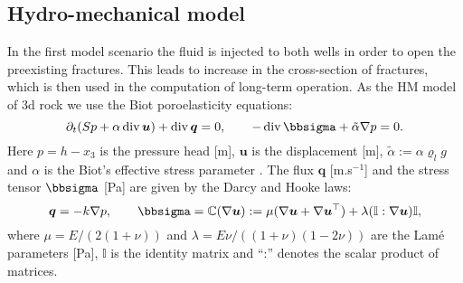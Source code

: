 \documentclass{article}
\newcommand{\CC}{\mathbb C}
\renewcommand{\div}{\operatorname{div}}
\newcommand{\eq}[1]{\begin{equation}#1\end{equation}}
\newcommand{\II}{\mathbb I}
\newcommand{\uu}{\vc u}
\newcommand{\vc}[1]{\boldsymbol{#1}}
\begin{document}
\subsection{Hydro-mechanical model}
\label{sc:hm_model}

In the first model scenario the fluid is injected to both wells in order to open the preexisting fractures.
This leads to increase in the cross-section of fractures, which is then used in the computation of long-term operation.
As the HM model of 3d rock we use the Biot poroelasticity equations:
\eq{\label{eq:biot} \partial_t(Sp + \alpha\div\uu) +\div\vc q = 0,\qquad -\div\bbsigma + \tilde\alpha\nabla p = 0. }
Here $p=h-x_3$ is the pressure head [m], $\uu$ is the displacement [m], $\tilde\alpha:=\alpha\varrho_l g$ and $\alpha$ is the Biot's effective stress parameter \cite{Biot1941}.
The flux $\vc q$ [m.s${}^{-1}$] and the stress tensor $\bbsigma$ [Pa] are given by the Darcy and Hooke laws:
\eq{ \vc q = - k\nabla p, \qquad \bbsigma = \CC(\nabla\uu) := \mu(\nabla\uu+\nabla\uu^\top) + \lambda(\II:\nabla\uu)\II, }
where $\mu=E/(2(1+\nu))$ and $\lambda=E\nu/((1+\nu)(1-2\nu))$ are the Lamé parameters [Pa], $\II$ is the identity matrix and ``:'' denotes the scalar product of matrices.
\end{document}
